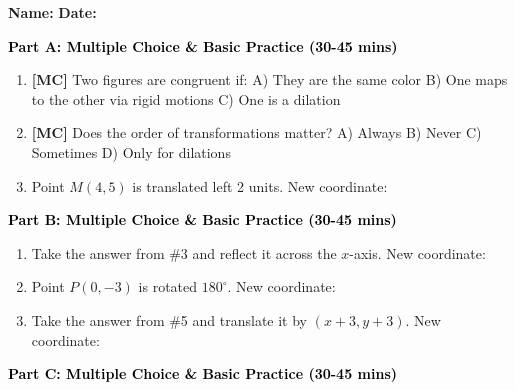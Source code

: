 \documentclass[12pt, letterpaper, fleqn]{article}
\newcommand{\blank}{\underline{\hspace{2.2cm}}}
\begin{document}
\textbf{Name:} \underline{\hspace{5cm}}
\hfill
\textbf{Date:} \underline{\hspace{3cm}}\\


\begin{tcolorbox}[colback=customteal!20]
\large\textcolor{black}{\textbf{Part A: Multiple Choice \& Basic Practice (30-45 mins)}}
\end{tcolorbox}

\vspace{3mm}

\begin{enumerate}[itemsep=2.5cm, leftmargin=0.6cm]
\item \textbf{[MC]} Two figures are congruent if:
A) They are the same color B) One maps to the other via rigid motions C) One is a dilation
\item \textbf{[MC]} Does the order of transformations matter?
A) Always B) Never C) Sometimes D) Only for dilations
\item Point $M(4, 5)$ is translated left 2 units. New coordinate: \blank
\end{enumerate}

\newpage

\begin{tcolorbox}[colback=customteal!20]
\large\textcolor{black}{\textbf{Part B: Multiple Choice \& Basic Practice (30-45 mins)}}
\end{tcolorbox}

\vspace{3mm}

\begin{enumerate}[itemsep=2.5cm, leftmargin=0.6cm, resume]
\item Take the answer from \#3 and reflect it across the $x$-axis. New coordinate: \blank
\item Point $P(0, -3)$ is rotated $180^\circ$. New coordinate: \blank
\item Take the answer from \#5 and translate it by $(x+3, y+3)$. New coordinate: \blank
\end{enumerate}

\newpage

\begin{tcolorbox}[colback=customteal!20]
\large\textcolor{black}{\textbf{Part C: Multiple Choice \& Basic Practice (30-45 mins)}}
\end{tcolorbox}
\end{document}
